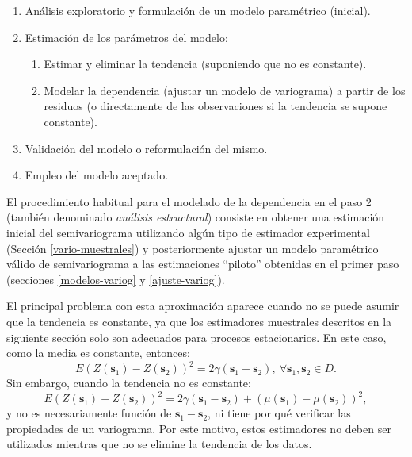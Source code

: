 \documentclass[
]{book}
\theoremstyle{break}
\theoremstyle{definition}
\theoremstyle{definition}
\theoremstyle{definition}
\theoremstyle{definition}
\theoremstyle{remark}
\begin{document}
\begin{enumerate}
\def\labelenumi{\arabic{enumi}.}
\item
  Análisis exploratorio y formulación de un modelo paramétrico (inicial).
\item
  Estimación de los parámetros del modelo:

  \begin{enumerate}
  \def\labelenumii{\arabic{enumii}.}
  \item
    Estimar y eliminar la tendencia (suponiendo que no es constante).
  \item
    Modelar la dependencia (ajustar un modelo de variograma) a partir de los residuos
    (o directamente de las observaciones si la tendencia se supone constante).
  \end{enumerate}
\item
  Validación del modelo o reformulación del mismo.
\item
  Empleo del modelo aceptado.
\end{enumerate}

El procedimiento habitual para el modelado de la dependencia en el paso 2 (también denominado \emph{análisis estructural}) consiste en obtener una estimación inicial del semivariograma utilizando algún tipo de estimador experimental (Sección \ref{vario-muestrales}) y posteriormente ajustar un modelo paramétrico válido de semivariograma a las estimaciones ``piloto'' obtenidas en el primer paso (secciones \ref{modelos-variog} y \ref{ajuste-variog}).

El principal problema con esta aproximación aparece cuando no se puede asumir que la tendencia es constante, ya que los estimadores muestrales descritos en la siguiente sección solo son adecuados para procesos estacionarios.
En este caso, como la media es constante, entonces:
\begin{equation} 
  E(Z(\mathbf{s}_1) - Z(\mathbf{s}_{2}))^2 = 2\gamma(\mathbf{s}_1 -\mathbf{s}_{2}),
  \ \forall \mathbf{s}_1 ,\mathbf{s}_{2} \in D.
\label{eq:vario-est}
\end{equation}
Sin embargo, cuando la tendencia no es constante:
\begin{equation} 
  E(Z(\mathbf{s}_1) - Z(\mathbf{s}_{2}))^2 = 2\gamma(\mathbf{s}_1 - \mathbf{s}_{2}) 
  + \left( \mu(\mathbf{s}_1)-\mu(\mathbf{s}_{2})\right)^2,
\label{eq:vario-nest}
\end{equation}
y no es necesariamente función de \(\mathbf{s}_1 -\mathbf{s}_{2}\), ni tiene por qué verificar las propiedades de un variograma.
Por este motivo, estos estimadores no deben ser utilizados mientras que no se elimine la tendencia de los datos.
\end{document}
